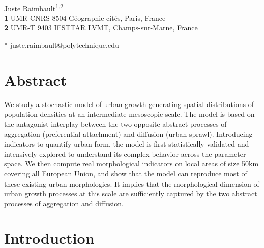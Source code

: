 \documentclass[10pt,letterpaper]{article}
\begin{document}
\vspace*{0.2in}

\begin{flushleft}
{\Large
\textbf{} %
}
\newline
\\
Juste Raimbault\textsuperscript{1,2}
\\
\bigskip
\textbf{1} UMR CNRS 8504 G{\'e}ographie-cit{\'e}s, Paris, France
\\
\textbf{2} UMR-T 9403 IFSTTAR LVMT, Champs-sur-Marne, France

* juste.raimbault@polytechnique.edu

\end{flushleft}
\section*{Abstract}
We study a stochastic model of urban growth generating spatial distributions of population densities at an intermediate mesoscopic scale. The model is based on the antagonist interplay between the two opposite abstract processes of aggregation (preferential attachment) and diffusion (urban sprawl). Introducing indicators to quantify urban form, the model is first statistically validated and intensively explored to understand its complex behavior across the parameter space. We then compute real morphological indicators on local areas of size 50km covering all European Union, and show that the model can reproduce most of these existing urban morphologies. It implies that the morphological dimension of urban growth processes at this scale are sufficiently captured by the two abstract processes of aggregation and diffusion.



\linenumbers


\section*{Introduction}
\end{document}
